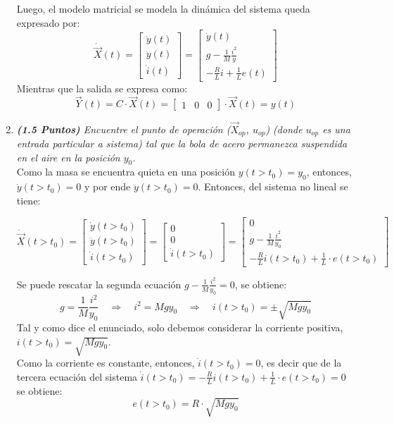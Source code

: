 \begin{enumerate}
Luego, el modelo matricial se modela la dinámica del sistema queda expresado por:
\[
\dot{\Vec{X}}(t) = 
\begin{bmatrix}
\dot{y}(t) \\
\ddot{y}(t) \\
\dot{i}(t)
\end{bmatrix}
=
\begin{bmatrix}
\dot{y}(t) \\
 g - \frac{1}{M}\frac{i^2}{y} \\
-\frac{R}{L}i + \frac{1}{L}e(t)
\end{bmatrix}
\]
Mientras que la salida se expresa como:
\[
\Vec{Y}(t) = C \cdot \Vec{X}(t) = \begin{bmatrix} 1 & 0 & 0 \end{bmatrix} \cdot \Vec{X}(t) = y(t)
\]
\item \textit{\textbf{(1.5 Puntos)} Encuentre el punto de operación ($\Vec{X}_{op}$, $u_{op}$) (donde $u_{op}$ es una entrada particular a sistema) tal que la bola de acero permanezca suspendida en el aire en la posición $y_0$.}\\

Como la masa se encuentra quieta en una posición $y(t>t_0)=y_0$, entonces, $\dot{y}(t>t_0)=0$ y por ende $\ddot{y}(t>t_0)=0$. Entonces, del sistema no lineal se tiene:

\[
\dot{\Vec{X}}(t>t_0) = \begin{bmatrix} \dot{y}(t>t_0) \\ \ddot{y}(t>t_0) \\ \dot{i}(t>t_0) \end{bmatrix} = \begin{bmatrix} 0 \\ 0 \\ \dot{i}(t>t_0) \end{bmatrix} = \begin{bmatrix} 0 \\ g - \frac{1}{M} \frac{i^2}{y_0} \\ -\frac{R}{L} i(t>t_0) + \frac{1}{L}\cdot e(t>t_0) \end{bmatrix}
\]

Se puede rescatar la segunda ecuación \(
g - \frac{1}{M} \frac{i^2}{y_0} = 0
\), se obtiene:
    \[
g = \frac{1}{M} \frac{i^2}{y_0} \quad \Rightarrow \quad i^2 = M g y_0
\quad \Rightarrow \quad i(t>t_0) = \pm \sqrt{M g y_0}
\]
Tal y como dice el enunciado, solo debemos considerar la corriente positiva, $i(t>t_0) = \sqrt{M g y_0}$.\\
Como la corriente es constante, entonces, $\dot{i}(t>t_0) = 0$, es decir que de la tercera ecuación del sistema \(\dot{i}(t>t_0) = -\frac{R}{L} i(t>t_0) + \frac{1}{L}\cdot e(t>t_0)=0\) se obtiene:
\[
e(t>t_0) = R\cdot \sqrt{Mgy_0}
\]


\end{enumerate}

